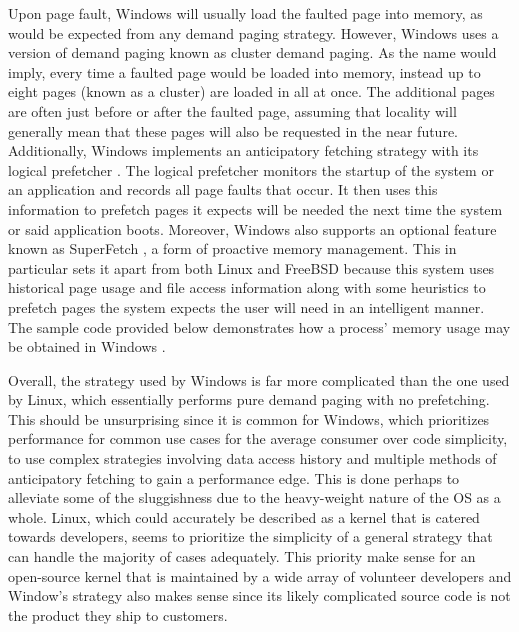 \documentclass[onecolumn, draftclsnofoot,10pt, compsoc]{IEEEtran}
\begin{document}
Upon page fault, Windows will usually load the faulted page into memory, as would be expected from any demand paging strategy. However, Windows uses a version of demand paging known as cluster demand paging. As the name would imply, every time a faulted page would be loaded into memory, instead up to eight pages (known as a cluster) are loaded in all at once. The additional pages are often just before or after the faulted page, assuming that locality will generally mean that these pages will also be requested in the near future. Additionally, Windows implements an anticipatory fetching strategy with its logical prefetcher \cite{WindowsInternals2}. The logical prefetcher monitors the startup of the system or an application and records all page faults that occur. It then uses this information to prefetch pages it expects will be needed the next time the system or said application boots. Moreover, Windows also supports an optional feature known as SuperFetch \cite{WindowsInternals2}, a form of proactive memory management. This in particular sets it apart from both Linux and FreeBSD because this system uses historical page usage and file access information along with some heuristics to prefetch pages the system expects the user will need in an intelligent manner. The sample code provided below demonstrates how a process' memory usage may be obtained in Windows \cite{CollectMemoryInfo}.

\par Overall, the strategy used by Windows is far more complicated than the one used by Linux, which essentially performs pure demand paging with no prefetching. This should be unsurprising since it is common for Windows, which prioritizes performance for common use cases for the average consumer over code simplicity, to use complex strategies involving data access history and multiple methods of anticipatory fetching to gain a performance edge. This is done perhaps to alleviate some of the sluggishness due to the heavy-weight nature of the OS as a whole. Linux, which could accurately be described as a kernel that is catered towards developers, seems to prioritize the simplicity of a general strategy that can handle the majority of cases adequately. This priority make sense for an open-source kernel that is maintained by a wide array of volunteer developers and Window's strategy also makes sense since its likely complicated source code is not the product they ship to customers.
\end{document}
